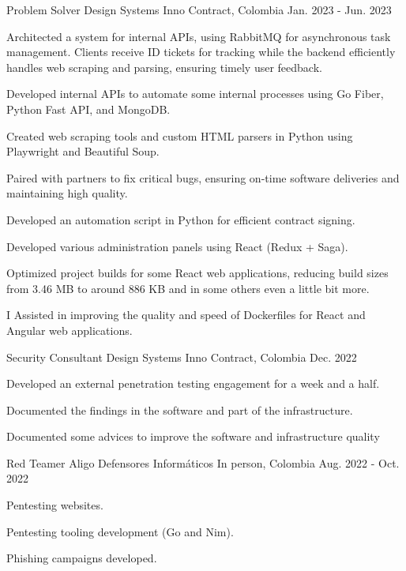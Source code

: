 \begin{cventries}
  \cventry
  {Problem Solver} %
  {Design Systems Inno} %
  {Contract, Colombia} %
  {Jan. 2023 - Jun. 2023} %
  {
    \begin{cvitems} %
      \item {Architected a system for internal APIs, using RabbitMQ for asynchronous task management. Clients receive ID tickets for tracking while the backend efficiently handles web scraping and parsing, ensuring timely user feedback.}
      \item {Developed internal APIs to automate some internal processes using Go Fiber, Python Fast API, and MongoDB.}
      \item {Created web scraping tools and custom HTML parsers in Python using Playwright and Beautiful Soup.}
      \item {Paired with partners to fix critical bugs, ensuring on-time software deliveries and maintaining high quality.}
      \item {Developed an automation script in Python for efficient contract signing.}
      \item {Developed various administration panels using React (Redux + Saga).}
      \item {Optimized project builds for some React web applications, reducing build sizes from 3.46 MB to around 886 KB and in some others even a little bit more.}
      \item {I Assisted in improving the quality and speed of Dockerfiles for React and Angular web applications.}
    \end{cvitems}
  }

  \cventry
  {Security Consultant} %
  {Design Systems Inno} %
  {Contract, Colombia} %
  {Dec. 2022} %
  {
    \begin{cvitems} %
      \item {Developed an external penetration testing engagement for a week and a half.}
      \item {Documented the findings in the software and part of the infrastructure.}
      \item {Documented some advices to improve the software and infrastructure quality}
    \end{cvitems}
  }

  \cventry
  {Red Teamer} %
  {Aligo Defensores Informáticos} %
  {In person, Colombia} %
  {Aug. 2022 - Oct. 2022} %
  {
    \begin{cvitems} %
      \item {Pentesting websites.}
      \item {Pentesting tooling development (Go and Nim).}
      \item {Phishing campaigns developed.}
    \end{cvitems}
  }


\end{cventries}
